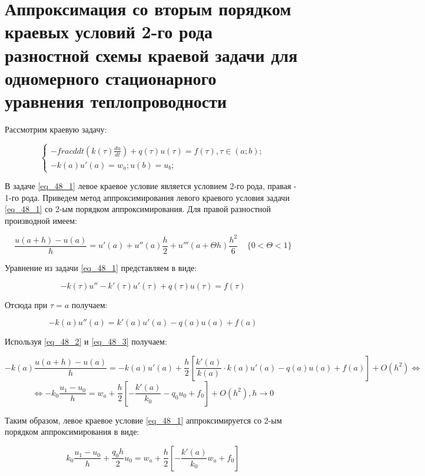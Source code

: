 \documentclass[__main__.tex]{subfiles}
\begin{document}
\section{Аппроксимация со вторым порядком краевых условий 2-го рода разностной схемы краевой задачи для одномерного стационарного уравнения теплопроводности}

Рассмотрим краевую задачу:

\begin{equation}
\label{eq_48_1}
\begin{cases}
-frac{d}{dt}(k(\tau) \frac{du}{dt}) + q(\tau)u(\tau) = f(\tau), \tau \in (a; b);\\
-k(a)u'(a) = w_a; u(b) = u_b;
\end{cases}
\end{equation}

В задаче \ref{eq_48_1} левое краевое условие является условием 2-го рода, правая - 1-го рода.
Приведем метод аппроксимирования левого краевого условия задачи \ref{eq_48_1} со 2-ым порядком аппроксимирования. Для правой разностной производной имеем:

\begin{equation}
\label{eq_48_2}
\frac{u(a + h) - u(a)}{h} = u'(a) + u''(a)\frac{h}{2} + u'''(a + \Theta h)\frac{h^2}{6}\;\;\;\;\{0 < \Theta < 1\}
\end{equation}

Уравнение из задачи \ref{eq_48_1} представляем в виде:

$$-k(\tau)u'' - k'(\tau)u'(\tau) + q(\tau)u(\tau) = f(\tau)$$

Отсюда при $\tau = a$ получаем:

\begin{equation}
\label{eq_48_3}
-k(a)u''(a) = k'(a)u'(a) - q(a)u(a) + f(a)
\end{equation}

Используя \ref{eq_48_2} и \ref{eq_48_3} получаем:

$$-k(a)\frac{u(a + h) - u(a)}{h} = -k(a)u'(a) + \frac{h}{2}\left[\frac{k'(a)}{k(a)} \cdot k(a) u'(a) - q(a) u(a) + f(a) \right] + O(h^2) \iff$$
$$\iff -k_0 \frac{u_1 - u_0}{h} = w_a + \frac{h}{2}\left[-\frac{k'(a)}{k_0} - q_0 u_0 + f_0\right] + O(h^2), h \to 0$$

Таким образом, левое краевое условие \ref{eq_48_1} аппроксимируется со 2-ым порядком аппроксимирования в виде:

$$k_0 \frac{u_1 - u_0}{h} + \frac{q_0 h}{2} u_0 = w_a + \frac{h}{2} \left[ - \frac{k'(a)}{k_0} w_a + f_0 \right]$$
 
\end{document}

